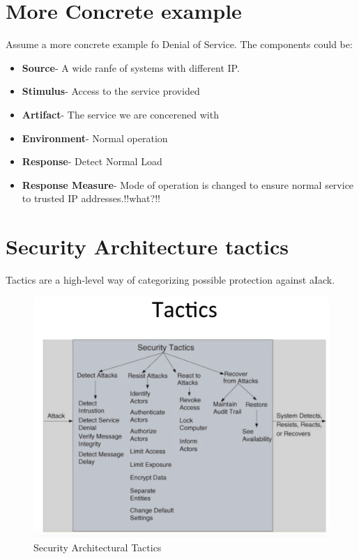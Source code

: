 \documentclass[a4paper]{report}
\begin{document}
\section{More Concrete example}
Assume a more concrete example fo Denial of Service. The components could be:
\begin{itemize}
\item \textbf{Source}- A wide ranfe of systems with different IP.
\item \textbf{Stimulus}- Access to the service provided
\item \textbf{Artifact}- The service we are concerened with
\item \textbf{Environment}- Normal operation
\item \textbf{Response}- Detect Normal Load
\item \textbf{Response Measure}- Mode of operation is changed to ensure normal service to trusted IP addresses.!!what?!!
\end{itemize}

\section{Security Architecture tactics}
Tactics are a high-level way of categorizing possible protection against aIack.
\begin{figure}[h]
\centering 
\includegraphics[scale=0.3]{aimages/sectactics.png}
\caption{\label{tab:widgets}Security Architectural Tactics}
\end{figure}
\end{document}
